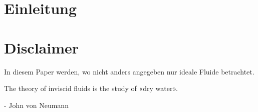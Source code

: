 \section{Einleitung}



\section*{Disclaimer}

In diesem Paper werden, wo nicht anders angegeben nur ideale Fluide betrachtet.

\begin{displayquote}
    The theory of inviscid fluids is the study of «dry water».

    - John von Neumann
\end{displayquote}
